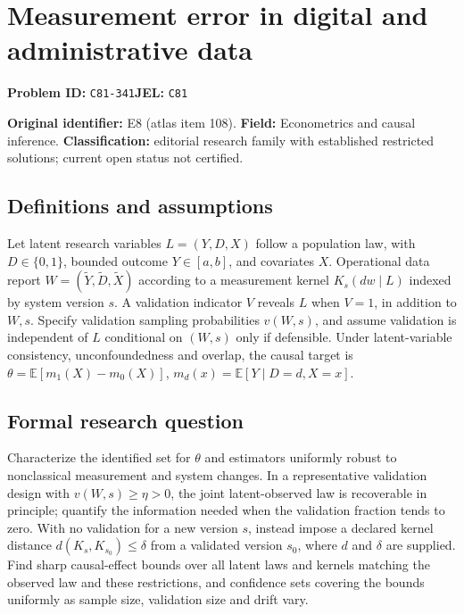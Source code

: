 \documentclass[11pt,a4paper]{article}
\begin{document}
\section*{Measurement error in digital and administrative data}
\textbf{Problem ID:} \texttt{C81-341}\quad \textbf{JEL:} \texttt{C81}\par
\label{problem:OP-0108}
\label{atlas:prob:E8}

\noindent\textbf{Original identifier:} E8 (atlas item 108). \textbf{Field:} Econometrics and causal inference. \textbf{Classification:} editorial research family with established restricted solutions; current open status not certified.

\subsection*{Definitions and assumptions}

Let latent research variables $L=(Y,D,X)$ follow a population law, with $D\in\{0,1\}$, bounded outcome $Y\in[a,b]$, and covariates $X$. Operational data report $W=(\widetilde Y,\widetilde D,\widetilde X)$ according to a measurement kernel $K_s(dw\mid L)$ indexed by system version $s$. A validation indicator $V$ reveals $L$ when $V=1$, in addition to $W,s$. Specify validation sampling probabilities $v(W,s)$, and assume validation is independent of $L$ conditional on $(W,s)$ only if defensible. Under latent-variable consistency, unconfoundedness and overlap, the causal target is $\theta=\mathbb E[m_1(X)-m_0(X)]$, $m_d(x)=\mathbb E[Y\mid D=d,X=x]$.

\subsection*{Formal research question}

Characterize the identified set for $\theta$ and estimators uniformly robust to nonclassical measurement and system changes. In a representative validation design with $v(W,s)\ge\eta>0$, the joint latent-observed law is recoverable in principle; quantify the information needed when the validation fraction tends to zero. With no validation for a new version $s$, instead impose a declared kernel distance $d(K_s,K_{s_0})\le\delta$ from a validated version $s_0$, where $d$ and $\delta$ are supplied. Find sharp causal-effect bounds over all latent laws and kernels matching the observed law and these restrictions, and confidence sets covering the bounds uniformly as sample size, validation size and drift vary.
\end{document}
